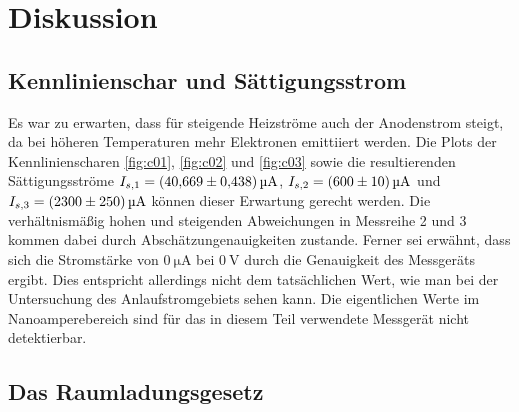 \section{Diskussion}

\subsection{Kennlinienschar und Sättigungsstrom}
Es war zu erwarten, dass für steigende Heizströme auch der Anodenstrom steigt, da bei höheren Temperaturen mehr
Elektronen emittiiert werden.
Die Plots der Kennlinienscharen \ref{fig:c01}, \ref{fig:c02} und \ref{fig:c03} sowie die resultierenden 
Sättigungsströme $I_{s,1} = \qty{40.669 \pm 0.438}{\micro\ampere}$, $I_{s,2} = \qty{600 \pm 10}{\micro\ampere}$ und 
$I_{s,3}= \qty{2300 \pm 250}{\micro\ampere}$ können dieser Erwartung gerecht werden.
Die verhältnismäßig hohen und steigenden Abweichungen in Messreihe 2 und 3 kommen dabei durch Abschätzungenauigkeiten zustande.
Ferner sei erwähnt, dass sich die Stromstärke von $\qty[]{0}{\micro\ampere}$ bei $\qty[]{0}{\volt}$ durch die Genauigkeit des 
Messgeräts ergibt.
Dies entspricht allerdings nicht dem tatsächlichen Wert, wie man bei der Untersuchung des Anlaufstromgebiets sehen kann.
Die eigentlichen Werte im Nanoamperebereich sind für das in diesem Teil verwendete Messgerät nicht detektierbar.




\subsection{Das Raumladungsgesetz}


